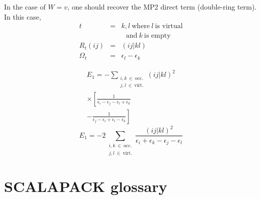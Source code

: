 \documentclass[aps,prb,reprint,showpacs]{revtex4-1}
\begin{document}
In the case of $W=v$, one should recover the MP2 direct term (double-ring term).
In this case,
\begin{eqnarray}
  t & =&  k,l~\text{where}~l~\text{is virtual} \nonumber \\
    &  &  ~~~\text{and}~k~\text{is empty} \nonumber \\
  R_t(ij)  &=& ( i j | k l ) \\
  \Omega_t &=& \epsilon_l - \epsilon_k 
\end{eqnarray}

\begin{multline}
E_1 = 
 -\sum_{ \substack{ i, k ~\in~\text{occ.} \\ j, l ~\in~\text{virt.}} } 
   ( i j | k l)^2 \\
     \times \left[ 
 \frac{ 1 } { \epsilon_i - \epsilon_j - \epsilon_l + \epsilon_k }
\right.  \\ \left.
    - \frac{ 1 }
      { \epsilon_j - \epsilon_i + \epsilon_l - \epsilon_k } 
   \right]
\end{multline}
\begin{equation}
E_1 = 
 -2 \sum_{ \substack{ i, k ~\in~\text{occ.} \\ j, l ~\in~\text{virt.}} } 
  \frac{  ( i j | k l)^2 } { \epsilon_i + \epsilon_k - \epsilon_j - \epsilon_l }
\end{equation}


\appendix

\section{SCALAPACK glossary}
\end{document}

